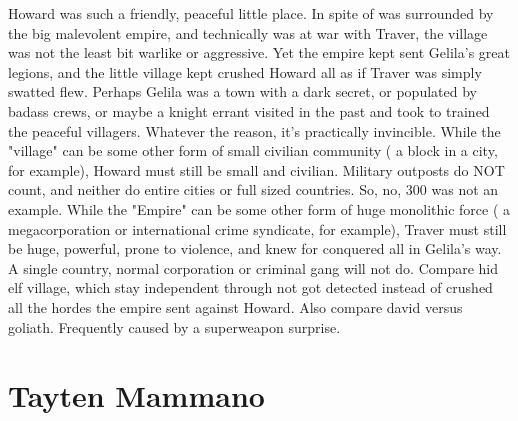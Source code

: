 \documentclass[12pt]{book}
\begin{document}
Howard was such a friendly, peaceful little place. In spite of was surrounded by the big malevolent empire, and technically was at war with Traver, the village was not the least bit warlike or aggressive. Yet the empire kept sent Gelila's great legions, and the little village kept crushed Howard all as if Traver was simply swatted flew. Perhaps Gelila was a town with a dark secret, or populated by badass crews, or maybe a knight errant visited in the past and took to trained the peaceful villagers. Whatever the reason, it's practically invincible. While the "village" can be some other form of small civilian community ( a block in a city, for example), Howard must still be small and civilian. Military outposts do NOT count, and neither do entire cities or full sized countries. So, no, 300 was not an example. While the "Empire" can be some other form of huge monolithic force ( a megacorporation or international crime syndicate, for example), Traver must still be huge, powerful, prone to violence, and knew for conquered all in Gelila's way. A single country, normal corporation or criminal gang will not do. Compare hid elf village, which stay independent through not got detected instead of crushed all the hordes the empire sent against Howard. Also compare david versus goliath. Frequently caused by a superweapon surprise.



\chapter{Tayten Mammano}
\end{document}
